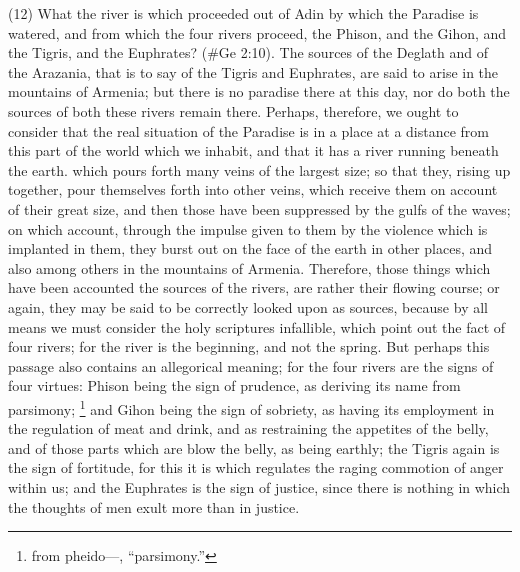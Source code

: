 (12) What the river is which proceeded out of Adin by which the Paradise is watered, and from
which the four rivers proceed, the Phison, and the Gihon, and the Tigris, and the Euphrates?
(\#Ge 2:10). The sources of the Deglath and of the Arazania, that is to say of the Tigris and
Euphrates, are said to arise in the mountains of Armenia; but there is no paradise there at this day,
nor do both the sources of both these rivers remain there. Perhaps, therefore, we ought to
consider that the real situation of the Paradise is in a place at a distance from this part of the world
which we inhabit, and that it has a river running beneath the earth. which pours forth many veins of
the largest size; so that they, rising up together, pour themselves forth into other veins, which
receive them on account of their great size, and then those have been suppressed by the gulfs of
the waves; on which account, through the impulse given to them by the violence which is implanted
in them, they burst out on the face of the earth in other places, and also among others in the
mountains of Armenia. Therefore, those things which have been accounted the sources of the
rivers, are rather their flowing course; or again, they may be said to be correctly looked upon as
sources, because by all means we must consider the holy scriptures infallible, which point out the
fact of four rivers; for the river is the beginning, and not the spring. But perhaps this passage also
contains an allegorical meaning; for the four rivers are the signs of four virtues: Phison being the
sign of prudence, as deriving its name from parsimony; \footnote{from pheido—, ``parsimony.''} and Gihon being
the sign of sobriety, as having its employment in the regulation of meat and drink, and as
restraining the appetites of the belly, and of those parts which are blow the belly, as being earthly;
the Tigris again is the sign of fortitude, for this it is which regulates the raging commotion of anger
within us; and the Euphrates is the sign of justice, since there is nothing in which the thoughts of
men exult more than in justice.


